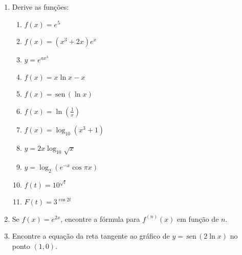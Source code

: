 \documentclass[a4paper,5pt]{amsbook}
\newcommand{\sen}{\,\mbox{sen}\,}
\newcommand{\ds}{\displaystyle}
\begin{document}
\vspace{1cm}
\begin{enumerate}
    \vspace{0.5cm}
    \item Derive as fun\c{c}\~oes:
        \begin{enumerate}
            \vspace{0.3cm}
            \item $f(x)=e^5$
            \vspace{0.3cm}
            \item $f(x)=(x^3+2x)e^x$
            \vspace{0.3cm}
            \item $y=e^{ax^3}$
            \vspace{0.3cm}
            \item $f(x)=x\ln{x}-x$
            \vspace{0.3cm}
            \item $f(x)=\sen{(\ln{x})}$
            \vspace{0.3cm}
            \item $f(x)=\ln{\left(\ds\frac{1}{x}\right)}$
            \vspace{0.3cm}
            \item $f(x)=\log_{10}(x^3+1)$
            \vspace{0.3cm}
            \item $y=2x\log_{10}\sqrt{x}$
            \vspace{0.3cm}
            \item $y=\log_2(e^{-x}\cos{\pi x})$
            \vspace{0.3cm}
            \item $f(t)=10^{\sqrt{t}}$
            \vspace{0.3cm}
            \item $F(t)=3^{\cos{2t}}$
        \end{enumerate}

    \vspace{0.5cm}
    \item Se $f(x)=e^{2x}$, encontre a f\'ormula para $f^{(n)}(x)$ em fun\c{c}\~ao de $n$.

    \vspace{0.5cm}
    \item Encontre a equa\c{c}\~ao da reta tangente ao gr\'afico de $y=\sen(2\ln{x})$
        no ponto $(1,0)$.


\end{enumerate}
\end{document}
